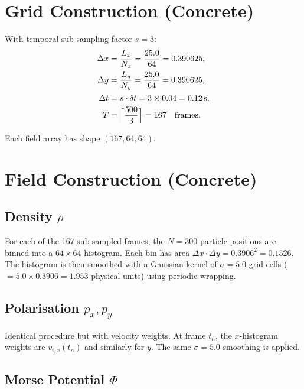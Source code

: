 \documentclass[11pt, letterpaper]{article}
\theoremstyle{definition}
\begin{document}
\section{Grid Construction (Concrete)}
\label{sec:concrete-grid}

With temporal sub-sampling factor $s = 3$:
\begin{align}
  \Delta x &= \frac{L_x}{N_x} = \frac{25.0}{64} = 0.390625, \\
  \Delta y &= \frac{L_y}{N_y} = \frac{25.0}{64} = 0.390625, \\
  \Delta t &= s \cdot \delta t = 3 \times 0.04 = 0.12\,\text{s}, \\
  T &= \Bigl\lceil\frac{500}{3}\Bigr\rceil = 167 \quad\text{frames}.
\end{align}

Each field array has shape $(167, 64, 64)$.

\section{Field Construction (Concrete)}
\label{sec:concrete-fields}

\subsection{Density $\rho$}

For each of the 167 sub-sampled frames, the $N = 300$ particle
positions are binned into a $64 \times 64$ histogram.  Each bin has
area $\Delta x \cdot \Delta y = 0.3906^{2} = 0.1526$.  The histogram
is then smoothed with a Gaussian kernel of $\sigma = 5.0$ grid cells
($= 5.0 \times 0.3906 = 1.953$ physical units) using periodic wrapping.

\subsection{Polarisation $p_x, p_y$}

Identical procedure but with velocity weights.  At frame $t_n$, the
$x$-histogram weights are $v_{i,x}(t_n)$ and similarly for $y$.
The same $\sigma = 5.0$ smoothing is applied.

\subsection{Morse Potential $\Phi$}
\end{document}
